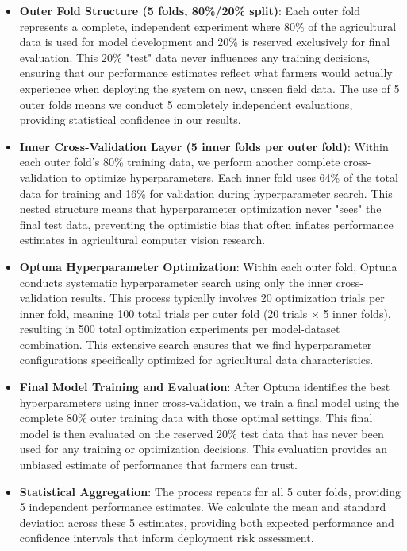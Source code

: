 \begin{itemize}
    \item \textbf{Outer Fold Structure (5 folds, 80\%/20\% split)}: Each outer fold represents a complete, independent experiment where 80\% of the agricultural data is used for model development and 20\% is reserved exclusively for final evaluation. This 20\% "test" data never influences any training decisions, ensuring that our performance estimates reflect what farmers would actually experience when deploying the system on new, unseen field data. The use of 5 outer folds means we conduct 5 completely independent evaluations, providing statistical confidence in our results.
    
    \item \textbf{Inner Cross-Validation Layer (5 inner folds per outer fold)}: Within each outer fold's 80\% training data, we perform another complete cross-validation to optimize hyperparameters. Each inner fold uses 64\% of the total data for training and 16\% for validation during hyperparameter search. This nested structure means that hyperparameter optimization never "sees" the final test data, preventing the optimistic bias that often inflates performance estimates in agricultural computer vision research.
    
    \item \textbf{Optuna Hyperparameter Optimization}: Within each outer fold, Optuna conducts systematic hyperparameter search using only the inner cross-validation results. This process typically involves 20 optimization trials per inner fold, meaning 100 total trials per outer fold (20 trials × 5 inner folds), resulting in 500 total optimization experiments per model-dataset combination. This extensive search ensures that we find hyperparameter configurations specifically optimized for agricultural data characteristics.
    
    \item \textbf{Final Model Training and Evaluation}: After Optuna identifies the best hyperparameters using inner cross-validation, we train a final model using the complete 80\% outer training data with those optimal settings. This final model is then evaluated on the reserved 20\% test data that has never been used for any training or optimization decisions. This evaluation provides an unbiased estimate of performance that farmers can trust.
    
    \item \textbf{Statistical Aggregation}: The process repeats for all 5 outer folds, providing 5 independent performance estimates. We calculate the mean and standard deviation across these 5 estimates, providing both expected performance and confidence intervals that inform deployment risk assessment.
\end{itemize}

